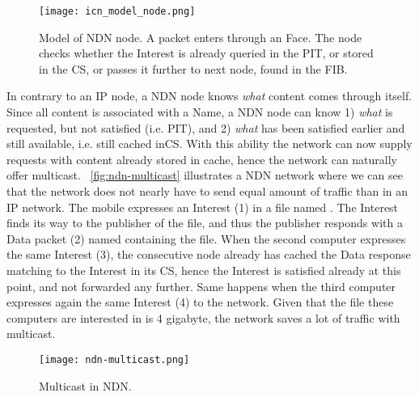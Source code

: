 \begin{figure}[H]
  \centering
  \texttt{[image: icn\_model\_node.png]}
  \caption{Model of NDN node. A packet enters through an Face. 
  The node checks whether the Interest is already queried in the PIT, or stored in the CS, or passes it further to next node, found in the FIB.}
  \label{fig:icn-model-node}
\end{figure}

In contrary to an \gls{IP} node, a \gls{NDN} node knows \textit{what} content comes through itself. 
Since all content is associated with a Name, a \gls{NDN} node can know 1) \textit{what} is requested, but not satisfied (i.e. \gls{PIT}), and 2) \textit{what} has been satisfied earlier and still available, i.e. still cached in\gls{CS}.
With this ability the network can now supply requests with content already stored in cache, hence the network can naturally offer multicast.
~\autoref{fig:ndn-multicast} illustrates a \gls{NDN} network where we can see that the network does not nearly have to send equal amount of traffic than in an \gls{IP} network.
The mobile expresses an Interest (1) in a file named .
The Interest finds its way to the publisher of the file, and thus the publisher responds with a Data packet (2) named  containing the file.
When the second computer expresses the same Interest (3), the consecutive node already has cached the Data response matching to the Interest in its \gls{CS}, hence the Interest is satisfied already at this point, and not forwarded any further.
Same happens when the third computer expresses again the same Interest (4) to the network.
Given that the file these computers are interested in is 4 gigabyte, the network saves a lot of traffic with multicast.
\begin{figure}[H]
  \centering
  \texttt{[image: ndn-multicast.png]}
  \caption{Multicast in NDN.}
  \label{fig:ndn-multicast}
\end{figure}
 
